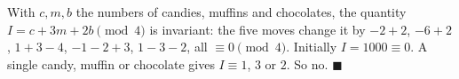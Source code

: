 With $c,m,b$ the numbers of candies, muffins and chocolates, the quantity $I=c+3m+2b\pmod4$ is invariant: the five moves change it by $-2+2$, $-6+2$, $1+3-4$, $-1-2+3$, $1-3-2$, all $\equiv0\pmod4$. Initially $I=1000\equiv0$. A single candy, muffin or chocolate gives $I\equiv1$, $3$ or $2$. So $\boxed{\text{no}}$. $\blacksquare$
